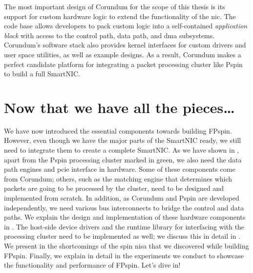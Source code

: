 The most important design of Corundum for the scope of this thesis is its support for custom hardware logic to extend the functionality of the \ac{nic}.  The code base allows developers to pack custom logic into a self-contained \emph{application block} with access to the control path, data path, and \ac{dma} subsystems.  Corundum's software stack also provides kernel interfaces for custom drivers and user space utilities, as well as example designs.  As a result, Corundum makes a perfect candidate platform for integrating a packet processing cluster like P\acs{spin} to build a full SmartNIC.

\section*{Now that we have all the pieces\ldots}

We have now introduced the essential components towards building FP\acs{spin}.  However, even though we have the major parts of the SmartNIC ready, we still need to integrate them to create a complete SmartNIC.  As we have shown in , apart from the P\acs{spin} processing cluster marked in green, we also need the data path engines and \ac{pcie} interface in hardware.  Some of these components come from Corundum; others, such as the matching engine that determines which packets are going to be processed by the cluster, need to be designed and implemented from scratch.  In addition, as Corundum and P\acs{spin} are developed independently, we need various bus interconnects to bridge the control and data paths.  We explain the design and implementation of these hardware components in .  The host-side device drivers and the runtime library for interfacing with the processing cluster need to be implemented as well; we discuss this in detail in .  We present in  the shortcomings of the \ac{spin} \ac{nisa} that we discovered while building FP\acs{spin}.  Finally, we explain in detail in  the experiments we conduct to showcase the functionality and performance of FP\acs{spin}.  Let's dive in!
